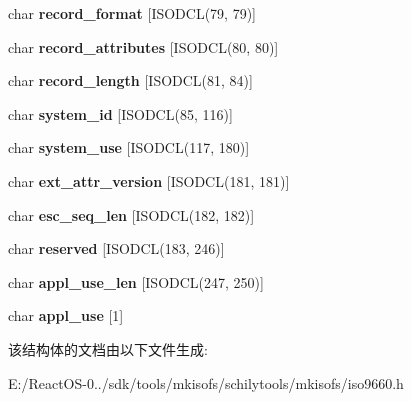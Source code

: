 \begin{DoxyCompactItemize}
char {\bfseries record\+\_\+format} \mbox{[}I\+S\+O\+D\+CL(79, 79)\mbox{]}
\item 
\mbox{\label{structiso__ext__attr__record_aa087c98c055488f68785769818b40be2}} 
char {\bfseries record\+\_\+attributes} \mbox{[}I\+S\+O\+D\+CL(80, 80)\mbox{]}
\item 
\mbox{\label{structiso__ext__attr__record_a6cbe91bf3cdd3bc879fa815aea3482b8}} 
char {\bfseries record\+\_\+length} \mbox{[}I\+S\+O\+D\+CL(81, 84)\mbox{]}
\item 
\mbox{\label{structiso__ext__attr__record_a632ae680c5fd746d9647f9c38952742a}} 
char {\bfseries system\+\_\+id} \mbox{[}I\+S\+O\+D\+CL(85, 116)\mbox{]}
\item 
\mbox{\label{structiso__ext__attr__record_a2391ffe1a91f702d58c8c5d8f5b14438}} 
char {\bfseries system\+\_\+use} \mbox{[}I\+S\+O\+D\+CL(117, 180)\mbox{]}
\item 
\mbox{\label{structiso__ext__attr__record_a2931e5208f800d82a3f12143229914f4}} 
char {\bfseries ext\+\_\+attr\+\_\+version} \mbox{[}I\+S\+O\+D\+CL(181, 181)\mbox{]}
\item 
\mbox{\label{structiso__ext__attr__record_a109b6a0d3f23c74ef29522590fa9b23b}} 
char {\bfseries esc\+\_\+seq\+\_\+len} \mbox{[}I\+S\+O\+D\+CL(182, 182)\mbox{]}
\item 
\mbox{\label{structiso__ext__attr__record_a2f05fc25714cb365426336d639abb59b}} 
char {\bfseries reserved} \mbox{[}I\+S\+O\+D\+CL(183, 246)\mbox{]}
\item 
\mbox{\label{structiso__ext__attr__record_a7df265c938e11e728822848a63bdb989}} 
char {\bfseries appl\+\_\+use\+\_\+len} \mbox{[}I\+S\+O\+D\+CL(247, 250)\mbox{]}
\item 
\mbox{\label{structiso__ext__attr__record_aa6cc2b11a0c44ceaf8d0ec1fbac65238}} 
char {\bfseries appl\+\_\+use} \mbox{[}1\mbox{]}
\end{DoxyCompactItemize}


该结构体的文档由以下文件生成\+:\begin{DoxyCompactItemize}
\item 
E\+:/\+React\+O\+S-\/0../sdk/tools/mkisofs/schilytools/mkisofs/iso9660.\+h\end{DoxyCompactItemize}
